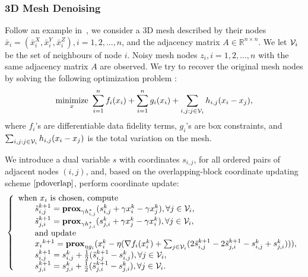 \subsubsection{3D Mesh Denoising}
Follow an example in~\cite{repetti2015random}, we consider a 3D mesh described by their nodes $\bar{x}_i=(\bar{x}_i^X,\bar{x}_i^Y,\bar{x}_i^Z), i=1,2,...,n$, and the adjacency matrix $A\in\mathbb{R}^{n\times n}$. We let ${\mathcal{V}}_i$  be the set of neighbours of node $i$. Noisy mesh nodes $z_i, i=1,2,...,n$  with the same adjacency matrix $A$ are observed. We try to recover the original mesh nodes by solving the following optimization problem \cite{repetti2015random}:
\begin{equation}
\Min_{x} ~\sum_{i=1}^n f_i(x_i)+\sum_{i=1}^n g_i(x_i)+\sum_{i,j:j\in \cV_{i}} h_{i,j}(x_{i}-x_{j}),
\end{equation}
where $f_i$'s are differentiable data fidelity terms, $g_i$'s are box constraints, and $\sum_{i,j:j\in {\mathcal{V}}_{i}} h_{i,j}(x_{i}-x_{j})$ is the total variation on the mesh.

We introduce a dual variable $s$ with coordinates $s_{i,j}$, for all ordered pairs of adjacent nodes $(i,j)$, and, based on the overlapping-block coordinate updating scheme $\eqref{pdoverlap}$, perform coordinate update:
\begin{equation}
\left\{
\begin{array}{l}
\text{when }x_i\text{ is chosen, compute}\\
\qquad \tilde{s}_{i,j}^{k+1}=\prox_{\gamma h_{i,j}^*} (s_{i,j}^k+\gamma x_i^k-\gamma x_j^k),\forall j\in\cV_i,\\
\qquad \tilde{s}_{j,i}^{k+1}=\prox_{\gamma h_{j,i}^*} (s_{j,i}^k+\gamma x_j^k-\gamma x_i^k),\forall j\in\cV_i,\\
\qquad \textnormal{and update}\\
\qquad {x_i}^{k+1}=\prox_{\eta g_i}(x_i^k-\eta(\nabla f_i(x_i^k)+\sum_{j\in\cV_i}(2\tilde{s}_{i,j}^{k+1}-2\tilde{s}_{j,i}^{k+1}-s_{i,j}^k+{s}_{j,i}^{k}))),\\
\qquad s_{i,j}^{k+1}=s_{i,j}^k+\frac{1}{2}(\tilde{s}_{i,j}^{k+1}-s_{i,j}^k),\forall j\in\cV_i,\\
\qquad s_{j,i}^{k+1}=s_{j,i}^k+\frac{1}{2}(\tilde{s}_{j,i}^{k+1}-s_{j,i}^k),\forall j\in\cV_i.
\end{array}
\right.\nonumber
\end{equation}
